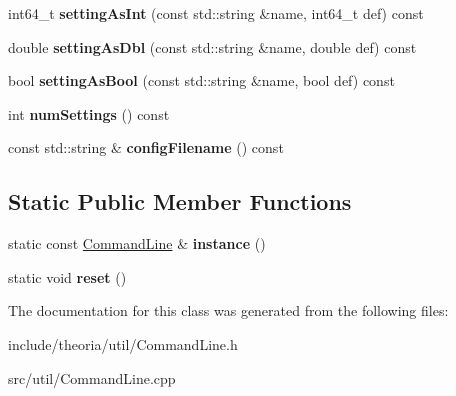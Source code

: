 \begin{DoxyCompactItemize}
\item 
\mbox{\label{classtheoria_1_1util_1_1CommandLine_abec4516f24ea88f83f1cabb16157cf8f}} 
int64\+\_\+t {\bfseries setting\+As\+Int} (const std\+::string \&name, int64\+\_\+t def) const
\item 
\mbox{\label{classtheoria_1_1util_1_1CommandLine_ae2ff2d5845f93ac135e9e4a1ff65b403}} 
double {\bfseries setting\+As\+Dbl} (const std\+::string \&name, double def) const
\item 
\mbox{\label{classtheoria_1_1util_1_1CommandLine_a745baeae69017e95c9c9cbe4633be2d6}} 
bool {\bfseries setting\+As\+Bool} (const std\+::string \&name, bool def) const
\item 
\mbox{\label{classtheoria_1_1util_1_1CommandLine_aa0f4075a16a8c490e5e27596534ca485}} 
int {\bfseries num\+Settings} () const
\item 
\mbox{\label{classtheoria_1_1util_1_1CommandLine_abac7c59a7bf3989959f0023455f3257e}} 
const std\+::string \& {\bfseries config\+Filename} () const
\end{DoxyCompactItemize}
\subsection*{Static Public Member Functions}
\begin{DoxyCompactItemize}
\item 
\mbox{\label{classtheoria_1_1util_1_1CommandLine_a361f672089b8bd3cb794645ee4629b72}} 
static const \hyperlink{classtheoria_1_1util_1_1CommandLine}{Command\+Line} \& {\bfseries instance} ()
\item 
\mbox{\label{classtheoria_1_1util_1_1CommandLine_a1a52772e7e3b17d0dd7aa099f28c4f1e}} 
static void {\bfseries reset} ()
\end{DoxyCompactItemize}


The documentation for this class was generated from the following files\+:\begin{DoxyCompactItemize}
\item 
include/theoria/util/Command\+Line.\+h\item 
src/util/Command\+Line.\+cpp\end{DoxyCompactItemize}
